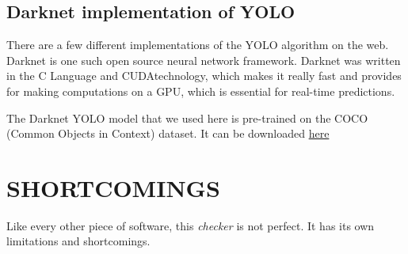 \documentclass[a4paper]{article}
\begin{document}
\subsection{Darknet implementation of YOLO}
There are a few different implementations of the YOLO algorithm on the web. Darknet is one such open source neural network framework. Darknet was written in the C Language and CUDAtechnology, which makes it really fast and provides for making computations on a GPU, which is essential for real-time predictions.

The Darknet YOLO model that we used here is pre-trained on the COCO (Common Objects in Context) dataset. It can be downloaded \href{https://pjreddie.com/darknet/yolo/}{here}
\newpage

\section{SHORTCOMINGS}

Like every other piece of software, this \textit{checker} is not perfect. It has its own limitations and shortcomings.
\end{document}
